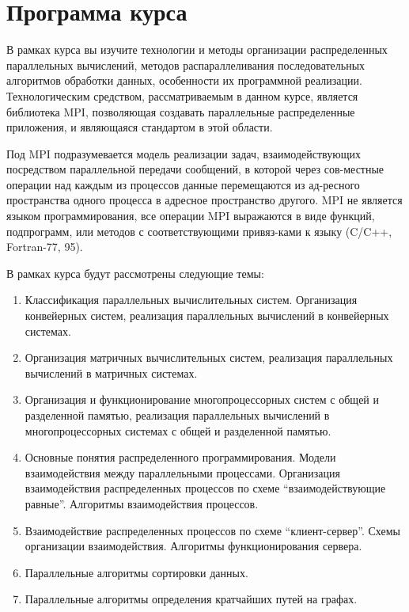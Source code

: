 \documentclass[a4paper,14pt]{extarticle}
\begin{document}


\section{Программа курса}
В рамках курса вы изучите технологии и методы организации распределенных
параллельных вычислений, методов распараллеливания последовательных алгоритмов
обработки данных, особенности их программной реализации. Технологическим
средством, рассматриваемым в данном курсе, является библиотека MPI, позволяющая
создавать параллельные распределенные приложения, и являющаяся стандартом в этой
области.

Под MPI подразумевается модель реализации задач, взаимодействующих посредством
параллельной передачи сообщений, в которой через сов-местные операции над каждым
из процессов данные перемещаются из ад-ресного пространства одного процесса в
адресное пространство другого. MPI не является языком программирования, все
операции MPI выражаются в виде функций, подпрограмм, или методов с
соответствующими привяз-ками к языку (C/C++, Fortran-77, 95).

В рамках курса будут рассмотрены следующие темы:
\begin{enumerate}
    \item Классификация параллельных вычислительных систем. Организация конвейерных систем, реализация параллельных вычислений в конвейерных системах.
    \item Организация матричных вычислительных систем, реализация параллельных вычислений в матричных системах.
    \item Организация и функционирование многопроцессорных систем с общей и разделенной памятью, реализация параллельных вычислений в многопроцессорных системах с общей и разделенной памятью.
    \item Основные понятия распределенного программирования. Модели взаимодействия между параллельными процессами. Организация взаимодействия распределенных процессов по схеме \enquote{взаимодействующие равные}. Алгоритмы взаимодействия процессов.
    \item Взаимодействие распределенных процессов по схеме \enquote{клиент-сервер}. Схемы организации взаимодействия. Алгоритмы функционирования сервера.
    \item Параллельные алгоритмы сортировки данных.
    \item Параллельные алгоритмы определения кратчайших путей на графах.
\end{enumerate}
\end{document}

